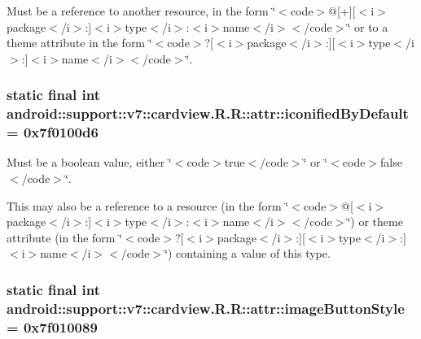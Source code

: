 Must be a reference to another resource, in the form \char`\"{}$<$code$>$@\mbox{[}+\mbox{]}\mbox{[}$<$i$>$package$<$/i$>$:\mbox{]}$<$i$>$type$<$/i$>$:$<$i$>$name$<$/i$>$$<$/code$>$\char`\"{} or to a theme attribute in the form \char`\"{}$<$code$>$?\mbox{[}$<$i$>$package$<$/i$>$:\mbox{]}\mbox{[}$<$i$>$type$<$/i$>$:\mbox{]}$<$i$>$name$<$/i$>$$<$/code$>$\char`\"{}. \hypertarget{classandroid_1_1support_1_1v7_1_1cardview_1_1_r_1_1attr_95887351e7f20df528e63ecb62d29ef5}{
\subsubsection[{iconifiedByDefault}]{\setlength{\rightskip}{0pt plus 5cm}static final int android::support::v7::cardview.R.R::attr::iconifiedByDefault = 0x7f0100d6}}
\label{classandroid_1_1support_1_1v7_1_1cardview_1_1_r_1_1attr_95887351e7f20df528e63ecb62d29ef5}


Must be a boolean value, either \char`\"{}$<$code$>$true$<$/code$>$\char`\"{} or \char`\"{}$<$code$>$false$<$/code$>$\char`\"{}. 

This may also be a reference to a resource (in the form \char`\"{}$<$code$>$@\mbox{[}$<$i$>$package$<$/i$>$:\mbox{]}$<$i$>$type$<$/i$>$:$<$i$>$name$<$/i$>$$<$/code$>$\char`\"{}) or theme attribute (in the form \char`\"{}$<$code$>$?\mbox{[}$<$i$>$package$<$/i$>$:\mbox{]}\mbox{[}$<$i$>$type$<$/i$>$:\mbox{]}$<$i$>$name$<$/i$>$$<$/code$>$\char`\"{}) containing a value of this type. \hypertarget{classandroid_1_1support_1_1v7_1_1cardview_1_1_r_1_1attr_d0b1b0350ed6da0a5130246484d3d9b2}{
\subsubsection[{imageButtonStyle}]{\setlength{\rightskip}{0pt plus 5cm}static final int android::support::v7::cardview.R.R::attr::imageButtonStyle = 0x7f010089}}
\label{classandroid_1_1support_1_1v7_1_1cardview_1_1_r_1_1attr_d0b1b0350ed6da0a5130246484d3d9b2}


